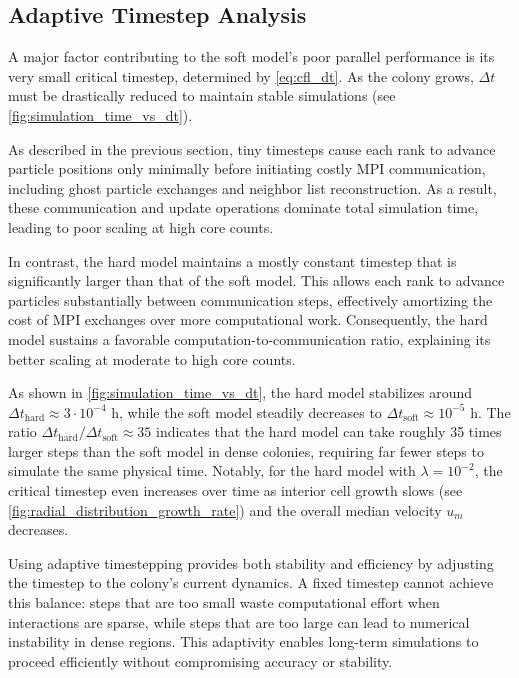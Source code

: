\documentclass[conference]{IEEEtran}
\begin{document}
\subsection{Adaptive Timestep Analysis}

A major factor contributing to the soft model's poor parallel performance is its very small critical timestep, determined by \autoref{eq:cfl_dt}. As the colony grows, $\Delta t$ must be drastically reduced to maintain stable simulations (see \autoref{fig:simulation_time_vs_dt}).

As described in the previous section, tiny timesteps cause each rank to advance particle positions only minimally before initiating costly MPI communication, including ghost particle exchanges and neighbor list reconstruction. As a result, these communication and update operations dominate total simulation time, leading to poor scaling at high core counts.

In contrast, the hard model maintains a mostly constant timestep that is significantly larger than that of the soft model. This allows each rank to advance particles substantially between communication steps, effectively amortizing the cost of MPI exchanges over more computational work. Consequently, the hard model sustains a favorable computation-to-communication ratio, explaining its better scaling at moderate to high core counts.

As shown in \autoref{fig:simulation_time_vs_dt}, the hard model stabilizes around $\Delta t_{\text{hard}} \approx 3 \cdot 10^{-4}$ h, while the soft model steadily decreases to $\Delta t_{\text{soft}} \approx 10^{-5}$ h. The ratio $\Delta t_{\text{hard}}/\Delta t_{\text{soft}} \approx 35$ indicates that the hard model can take roughly 35 times larger steps than the soft model in dense colonies, requiring far fewer steps to simulate the same physical time. Notably, for the hard model with $\lambda = 10^{-2}$, the critical timestep even increases over time as interior cell growth slows (see \autoref{fig:radial_distribution_growth_rate}) and the overall median velocity $u_m$ decreases.

Using adaptive timestepping provides both stability and efficiency by adjusting the timestep to the colony's current dynamics. A fixed timestep cannot achieve this balance: steps that are too small waste computational effort when interactions are sparse, while steps that are too large can lead to numerical instability in dense regions. This adaptivity enables long-term simulations to proceed efficiently without compromising accuracy or stability.
\end{document}
